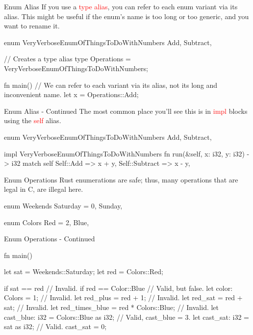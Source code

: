 \documentclass[10pt,xcolor={dvipsnames}, aspectratio=169]{beamer}
\begin{document}
	\begin{frame}[fragile]{Enum Alias}
	    If you use a \textcolor{red}{type alias}, you can refer to each enum variant via its alias. This might be useful if the enum's name is too long or too generic, and you want to rename it. \\
        \begin{rustcode}
enum VeryVerboseEnumOfThingsToDoWithNumbers {
    Add,
    Subtract,
}

// Creates a type alias
type Operations = VeryVerboseEnumOfThingsToDoWithNumbers;

fn main() {
    // We can refer to each variant via its alias, not its long and inconvenient name.
    let x = Operations::Add;
}
        \end{rustcode}
	\end{frame}
	\begin{frame}[fragile]{Enum Alias - Continued}
	    The most common place you'll see this is in \textcolor{red}{impl} blocks using the \textcolor{red}{self} alias. \\
        \begin{rustcode}
enum VeryVerboseEnumOfThingsToDoWithNumbers {
    Add,
    Subtract,
}

impl VeryVerboseEnumOfThingsToDoWithNumbers {
    fn run(&self, x: i32, y: i32) -> i32 {
        match self {
            Self::Add => x + y,
            Self::Subtract => x - y,
        }
    }
}
        \end{rustcode}
	\end{frame}
	\begin{frame}[fragile]{Enum Operations}
	Rust enumerations are safe; thus, many operations that are legal in C, are illegal here. \\
        \begin{rustcode}
enum Weekends {
    Saturday = 0,
    Sunday,
}

enum Colors {
    Red = 2,
    Blue,
}
   \end{rustcode}
	\end{frame}
\begin{frame}[fragile]{Enum Operations - Continued}
\begin{rustcode}
fn main() {
    let sat = Weekends::Saturday;
    let red = Colors::Red;
    
    if sat == red { // Invalid. }
    if red == Color::Blue { // Valid, but false. }
    let color: Colors = 1; // Invalid.
    let red_plus = red + 1; // Invalid.
    let red_sat = red + sat; // Invalid.
    let red_times_blue = red * Colors::Blue; // Invalid.
    let cast_blue: i32 = Colors::Blue as i32; // Valid, cast_blue = 3.
    let cast_sat: i32 = sat as i32; // Valid. cast_sat = 0;
}
        \end{rustcode}
	\end{frame}
	
\end{document}
